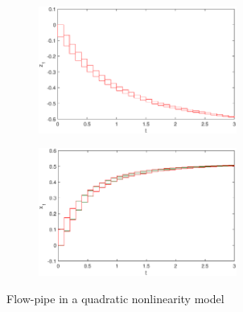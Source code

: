 \documentclass[runningheads,a4paper]{llncs}
\theoremstyle{definition}
\theoremstyle{plain}
\begin{document}
\begin{figure}[h]
\begin{subfigure}{.5\textwidth}
  \centering
  \includegraphics[width=6.5cm]{IC_r.eps}
  \parbox{4cm}{\subcaption{}}
\end{subfigure}%
\begin{subfigure}{.5\textwidth}
  \centering
  \includegraphics[width=6.5cm]{IC2compare_flowpip.eps}
  \parbox{4cm}{\subcaption{}}
\end{subfigure}%
\caption{Flow-pipe in a quadratic nonlinearity model}
\label{fig:flowpipe_IC2}
\end{figure}
\end{document}
